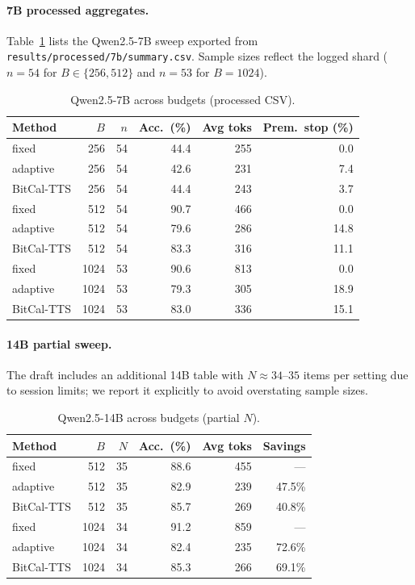 \documentclass[11pt]{article}
\begin{document}
\paragraph{7B processed aggregates.}
Table~\ref{tab:7blog} lists the Qwen2.5-7B sweep exported from \texttt{results/processed/7b/summary.csv}. Sample sizes reflect the logged shard ($n{=}54$ for $B{\in}\{256,512\}$ and $n{=}53$ for $B{=}1024$).

\begin{table}[h]
\centering
\caption{Qwen2.5-7B across budgets (processed CSV).}
\label{tab:7blog}
\begin{tabular}{lrrrrr}
\toprule
Method & $B$ & $n$ & Acc.\ (\%) & Avg toks & Prem.\ stop (\%) \\
\midrule
fixed      & 256  & 54 & 44.4 & 255 & 0.0 \\
adaptive   & 256  & 54 & 42.6 & 231 & 7.4 \\
BitCal-TTS & 256  & 54 & 44.4 & 243 & 3.7 \\
\midrule
fixed      & 512  & 54 & 90.7 & 466 & 0.0 \\
adaptive   & 512  & 54 & 79.6 & 286 & 14.8 \\
BitCal-TTS & 512  & 54 & 83.3 & 316 & 11.1 \\
\midrule
fixed      & 1024 & 53 & 90.6 & 813 & 0.0 \\
adaptive   & 1024 & 53 & 79.3 & 305 & 18.9 \\
BitCal-TTS & 1024 & 53 & 83.0 & 336 & 15.1 \\
\bottomrule
\end{tabular}
\end{table}

\paragraph{14B partial sweep.}
The draft includes an additional 14B table with $N{\approx}34$--$35$ items per setting due to session limits; we report it explicitly to avoid overstating sample sizes.

\begin{table}[h]
\centering
\caption{Qwen2.5-14B across budgets (partial $N$).}
\begin{tabular}{lrrrrr}
\toprule
Method & $B$ & $N$ & Acc.\ (\%) & Avg toks & Savings \\
\midrule
fixed      & 512  & 35 & 88.6 & 455 & --- \\
adaptive   & 512  & 35 & 82.9 & 239 & 47.5\% \\
BitCal-TTS & 512  & 35 & 85.7 & 269 & 40.8\% \\
fixed      & 1024 & 34 & 91.2 & 859 & --- \\
adaptive   & 1024 & 34 & 82.4 & 235 & 72.6\% \\
BitCal-TTS & 1024 & 34 & 85.3 & 266 & 69.1\% \\
\bottomrule
\end{tabular}
\end{table}
\end{document}
